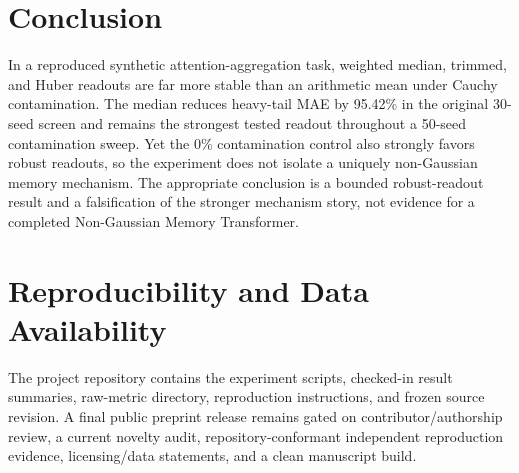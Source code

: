 \documentclass[10pt]{article}
\begin{document}
\section{Conclusion}
In a reproduced synthetic attention-aggregation task, weighted median, trimmed, and Huber readouts are far more stable than an arithmetic mean under Cauchy contamination. The median reduces heavy-tail MAE by 95.42\% in the original 30-seed screen and remains the strongest tested readout throughout a 50-seed contamination sweep. Yet the 0\% contamination control also strongly favors robust readouts, so the experiment does not isolate a uniquely non-Gaussian memory mechanism. The appropriate conclusion is a bounded robust-readout result and a falsification of the stronger mechanism story, not evidence for a completed Non-Gaussian Memory Transformer.

\section*{Reproducibility and Data Availability}
The project repository contains the experiment scripts, checked-in result summaries, raw-metric directory, reproduction instructions, and frozen source revision. A final public preprint release remains gated on contributor/authorship review, a current novelty audit, repository-conformant independent reproduction evidence, licensing/data statements, and a clean manuscript build.



\end{document}
